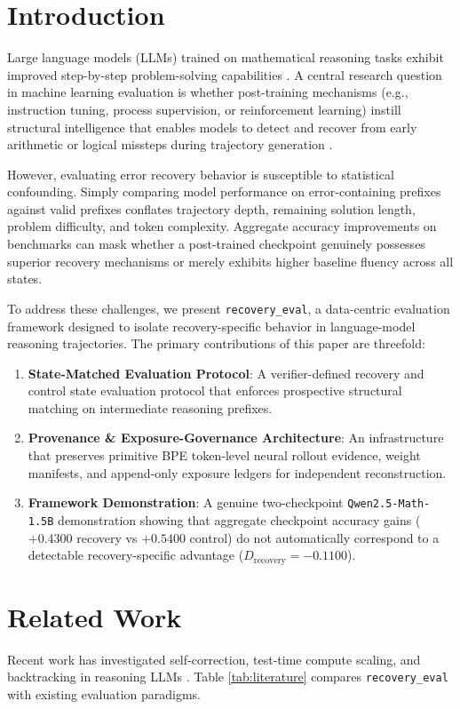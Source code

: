 \documentclass[10pt,conference]{IEEEtran}
\begin{document}
\section{Introduction}
Large language models (LLMs) trained on mathematical reasoning tasks exhibit improved step-by-step problem-solving capabilities \cite{cobbe2021gsm8k, qwen25math2024}. A central research question in machine learning evaluation is whether post-training mechanisms (e.g., instruction tuning, process supervision, or reinforcement learning) instill structural intelligence that enables models to detect and recover from early arithmetic or logical missteps during trajectory generation \cite{lightman2023process, zelikman2022star}.

However, evaluating error recovery behavior is susceptible to statistical confounding. Simply comparing model performance on error-containing prefixes against valid prefixes conflates trajectory depth, remaining solution length, problem difficulty, and token complexity. Aggregate accuracy improvements on benchmarks can mask whether a post-trained checkpoint genuinely possesses superior recovery mechanisms or merely exhibits higher baseline fluency across all states.

To address these challenges, we present \texttt{recovery\_eval}, a data-centric evaluation framework designed to isolate recovery-specific behavior in language-model reasoning trajectories. The primary contributions of this paper are threefold:
\begin{enumerate}
    \item \textbf{State-Matched Evaluation Protocol}: A verifier-defined recovery and control state evaluation protocol that enforces prospective structural matching on intermediate reasoning prefixes.
    \item \textbf{Provenance \& Exposure-Governance Architecture}: An infrastructure that preserves primitive BPE token-level neural rollout evidence, weight manifests, and append-only exposure ledgers for independent reconstruction.
    \item \textbf{Framework Demonstration}: A genuine two-checkpoint \texttt{Qwen2.5-Math-1.5B} demonstration showing that aggregate checkpoint accuracy gains ($+0.4300$ recovery vs $+0.5400$ control) do not automatically correspond to a detectable recovery-specific advantage ($D_{\text{recovery}} = -0.1100$).
\end{enumerate}

\section{Related Work}
Recent work has investigated self-correction, test-time compute scaling, and backtracking in reasoning LLMs \cite{snell2024scaling, wang2022selfconsistency}. Table \ref{tab:literature} compares \texttt{recovery\_eval} with existing evaluation paradigms.
\end{document}
